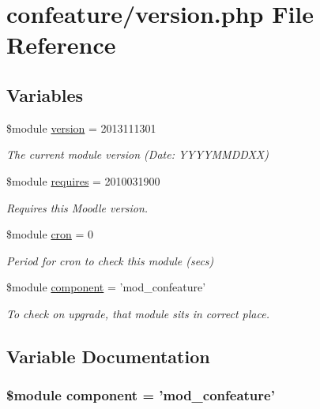 \hypertarget{version_8php}{\section{confeature/version.php File Reference}
\label{version_8php}
}
\subsection*{Variables}
\begin{DoxyCompactItemize}
\item 
\$module \hyperlink{version_8php_a1e2b2712a04f3a2db37b7057e4692a62}{version} = 2013111301
\begin{DoxyCompactList}\small\item\em The current module version (Date\-: Y\-Y\-Y\-Y\-M\-M\-D\-D\-X\-X) \end{DoxyCompactList}\item 
\$module \hyperlink{version_8php_a4c0ff460b6d47c1f7d1a74f2f5d74b9f}{requires} = 2010031900
\begin{DoxyCompactList}\small\item\em Requires this Moodle version. \end{DoxyCompactList}\item 
\$module \hyperlink{version_8php_ac5478dfb9d76c36e604131b38740821a}{cron} = 0
\begin{DoxyCompactList}\small\item\em Period for cron to check this module (secs) \end{DoxyCompactList}\item 
\$module \hyperlink{version_8php_ac89a4ebe36a201f6c83db18ec8abbebd}{component} = 'mod\-\_\-confeature'
\begin{DoxyCompactList}\small\item\em To check on upgrade, that module sits in correct place. \end{DoxyCompactList}\end{DoxyCompactItemize}


\subsection{Variable Documentation}
\hypertarget{version_8php_ac89a4ebe36a201f6c83db18ec8abbebd}{
\subsubsection[{component}]{\setlength{\rightskip}{0pt plus 5cm}\$module component = 'mod\-\_\-confeature'}}\label{version_8php_ac89a4ebe36a201f6c83db18ec8abbebd}



